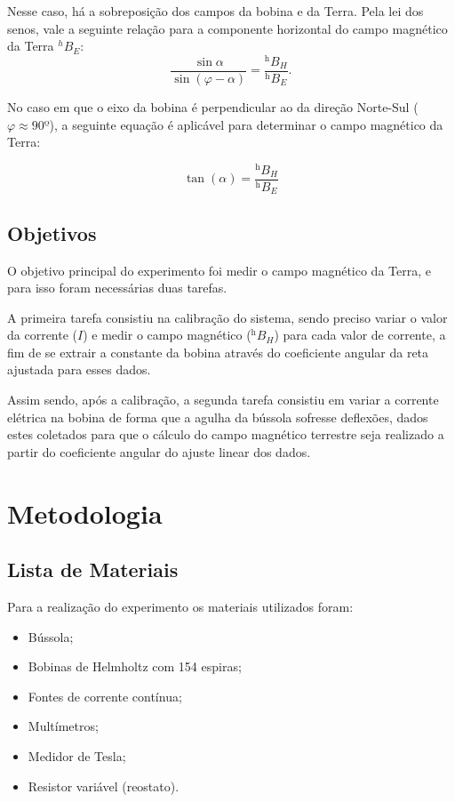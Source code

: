 \documentclass[reprint,amsmath,amssymb,aps]{revtex4-2}
\begin{document}
Nesse caso, há a sobreposição dos campos da bobina e da Terra. Pela lei dos senos, vale a seguinte relação para a componente horizontal do campo magnético da Terra $^hB_E$:
\begin{equation}
    \frac{\sin{\alpha}}{\sin(\varphi - \alpha)} = \frac{^\text{h} B_H}{^\text{h} B_E}.
\end{equation}

No caso em que o eixo da bobina é perpendicular ao da direção Norte-Sul ($\varphi \approx 90º$), a seguinte equação é aplicável para determinar o campo magnético da Terra:

\begin{equation}
    \tan(\alpha) = \frac{^\text{h}B_H}{^\text{h}B_E}
\end{equation}

\subsection{Objetivos}

O objetivo principal do experimento foi medir o campo magnético da Terra, e para isso foram necessárias duas tarefas.

A primeira tarefa consistiu na calibração do sistema, sendo preciso variar o valor da corrente ($I$) e medir o campo magnético ($^\text{h}B_H$) para cada valor de corrente, a fim de se extrair a constante da bobina através do coeficiente angular da reta ajustada para esses dados.

Assim sendo, após a calibração, a segunda tarefa consistiu em variar a corrente elétrica na bobina de forma que a agulha da bússola sofresse deflexões, dados estes coletados para que o cálculo do campo magnético terrestre seja realizado a partir do coeficiente angular do ajuste linear dos dados.

\section{Metodologia}

\subsection{Lista de Materiais}
Para a realização do experimento os materiais utilizados foram:
\begin{itemize}
    \item Bússola;
    \item Bobinas de Helmholtz com 154 espiras;
    \item Fontes de corrente contínua;
    \item Multímetros;
    \item Medidor de Tesla;
    \item Resistor variável (reostato).
\end{itemize}
\end{document}
